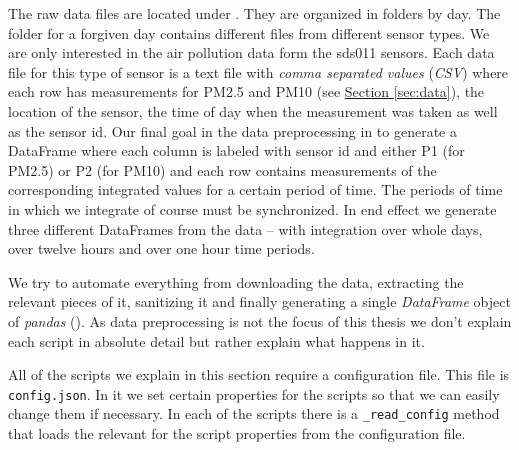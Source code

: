 \documentclass[12pt,a4paper,twoside]{scrartcl}
\numberwithin{equation}{section}
\newcommand{\refsec}[1]{\hyperref[#1]{Section \ref*{#1}}}
\begin{document}
The raw data files are located under \cite{datalink}. They are organized in folders by day. The folder for a forgiven day contains different files from different sensor types. We are only interested in the air pollution data form the sds011 sensors. Each data file for this type of sensor is a text file with \emph{comma separated values} (\emph{CSV}) where each row has measurements for PM2.5 and PM10 (see \refsec{sec:data}), the location of the sensor, the time of day when the measurement was taken as well as the sensor id. Our final goal in the data preprocessing in to generate a DataFrame where each column is labeled with sensor id and either P1 (for PM2.5) or P2 (for PM10) and each row contains measurements of the corresponding integrated values for a certain period of time. The periods of time in which we integrate of course must be synchronized. In end effect we generate three different DataFrames from the data -- with integration over whole days, over twelve hours and over one hour time periods.

We try to automate everything from downloading the data, extracting the relevant pieces of it, sanitizing it and finally generating a single \emph{DataFrame} object of \emph{pandas} (\cite{pandas}). As data preprocessing is not the focus of this thesis we don't explain each script in absolute detail but rather explain what happens in it.

All of the scripts we explain in this section require a configuration file. This file is \texttt{config.json}. In it we set certain properties for the scripts so that we can easily change them if necessary. In each of the scripts there is a \texttt{\_read\_config} method that loads the relevant for the script properties from the configuration file.
\end{document}
